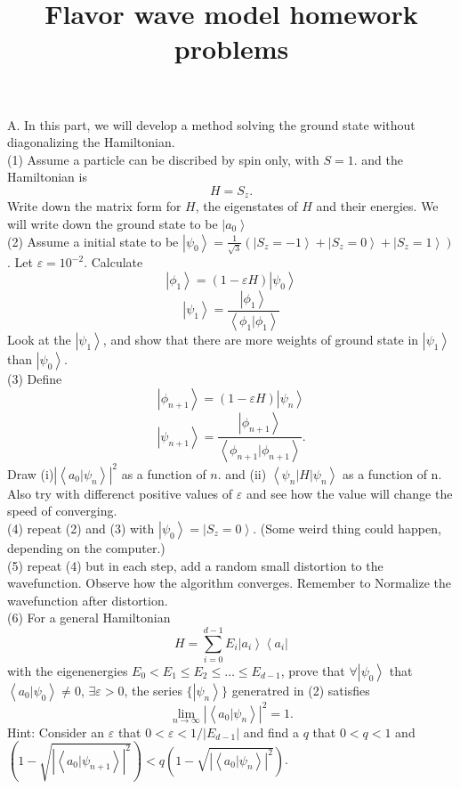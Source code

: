 \documentclass[letter]{article}
\title{{\myfont Flavor wave model homework problems}}
\begin{document}
\maketitle
\indent A. In this part, we will develop a method solving the ground state without diagonalizing the Hamiltonian.\\
\indent (1)  Assume a particle can be discribed by spin only, with $S=1$. and the Hamiltonian is 
$$ H= S_z.
$$
Write down the matrix form for $H$, the eigenstates of $H$ and their energies. We will write down the ground state to be $\left|a_0\right>$\\
\indent (2) Assume a initial state to be $\left|\psi_0\right>=\frac{1}{\sqrt{3}}(\left|S_z=-1\right>+\left|S_z=0\right>+\left|S_z=1\right>)$. Let $\varepsilon=10^{-2}$. Calculate 
$$\left|\phi_1\right>=\left(1-\varepsilon H \right)\left|\psi_0\right>$$
$$\left|\psi_1\right>=\frac{\left|\phi_1\right>}{\left<\phi_1|\phi_1\right>}$$
Look at the $\left|\psi_1\right>$, and show that  there are more weights of ground state in $\left|\psi_1\right>$ than $\left|\psi_0\right>$.\\
\indent (3) Define 
$$\left|\phi_{n+1}\right>=\left(1-\varepsilon H\right) \left|\psi_n\right>$$
$$\left|\psi_{n+1}\right>=\frac{\left|\phi_{n+1}\right>}{\left<\phi_{n+1}|\phi_{n+1}\right>}.$$
Draw (i)$\left|\left<a_0|\psi_n\right>\right|^2$ as a function of $n$. and 
(ii) $\left<\psi_n|H|\psi_n\right>$ as a function of n. Also try with differenct positive values of $\varepsilon$ and see how the value will change the speed of converging.\\
\indent (4) repeat (2) and (3) with $\left|\psi_0\right>=\left|S_z=0\right>$. (Some weird thing could happen, depending on the computer.)\\ 
\indent (5) repeat (4) but in each step, add a random small distortion to the wavefunction. Observe how the algorithm converges. Remember to Normalize the wavefunction after distortion.\\ 
\indent (6) For a general Hamiltonian
$$ H = \sum_{i=0}^{d-1} E_{i} \left|a_i\right>\left<a_i\right|
$$
with the eigenenergies $E_0<E_1\leq E_2 \leq \ldots\leq E_{d-1}$, prove that $\forall \left|\psi_0\right> $ that $\left<a_0|\psi_0\right>\neq 0$, $\exists \varepsilon>0$, the series $\{\left| \psi_n\right>\}$ generatred in (2) satisfies $$
\lim_{n\rightarrow\infty} \left|\left<a_0|\psi_n\right>\right|^2=1.
$$
\indent Hint: Consider an $\varepsilon$ that $0<\varepsilon<1/|E_{d-1}|$ and find a $q$ that $0<q<1$ and $\left(1-\sqrt{\left|\left<a_0|\psi_{n+1}\right>\right|^2}\right)<q\left(1-\sqrt{\left|\left<a_0|\psi_{n}\right>\right|^2}\right)$.\\
\end{document}
